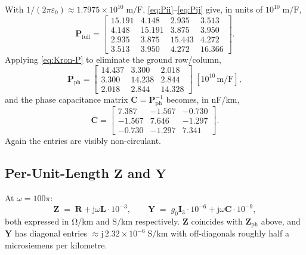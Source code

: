 \documentclass[11pt,a4paper]{article}
\newcommand{\jj}{\mathrm{j}}
\newcommand{\matZ}{\bm{Z}}
\newcommand{\matY}{\bm{Y}}
\newcommand{\matR}{\bm{R}}
\newcommand{\matL}{\bm{L}}
\newcommand{\matC}{\bm{C}}
\newcommand{\matP}{\bm{P}}
\newcommand{\matI}{\bm{I}}
\begin{document}
With \(1/(2\pi\varepsilon_{0})\approx 1.7975\times 10^{10}\;\si{\metre/\farad}\), \eqref{eq:Pii}--\eqref{eq:Pij} give, in units of
\(10^{10}\;\si{\metre/\farad}\),
\begin{equation*}
\matP_{\mathrm{full}}=
\begin{bmatrix}
15.191 & 4.148 & 2.935 & 3.513\\
4.148 & 15.191 & 3.875 & 3.950\\
2.935 & 3.875 & 15.443 & 4.272\\
3.513 & 3.950 & 4.272 & 16.366
\end{bmatrix}.
\end{equation*}
Applying \eqref{eq:Kron-P} to eliminate the ground row/column,
\begin{equation*}
\matP_{\mathrm{ph}}=
\begin{bmatrix}
14.437 & 3.300 & 2.018\\
3.300 & 14.238 & 2.844\\
2.018 & 2.844 & 14.328
\end{bmatrix}\;[10^{10}\,\si{\metre/\farad}],
\end{equation*}
and the phase capacitance matrix
\(\matC=\matP_{\mathrm{ph}}^{-1}\) becomes, in \si{\nano\farad/\kilo\metre},
\begin{equation*}
\matC=
\begin{bmatrix}
7.387 & -1.567 & -0.730\\
-1.567 & 7.646 & -1.297\\
-0.730 & -1.297 & 7.341
\end{bmatrix}.
\end{equation*}
Again the entries are visibly non-circulant.

\subsection{\texorpdfstring{Per-Unit-Length \(\matZ\) and \(\matY\)}{Per-Unit-Length Z and Y}}

At \(\omega=100\pi\):
\begin{equation*}
\matZ\;=\;\matR+\jj\omega\matL\cdot 10^{-3},\qquad
\matY\;=\;g_{0}\matI_{3}\cdot 10^{-6}+\jj\omega\matC\cdot 10^{-9},
\end{equation*}
both expressed in \(\si{\ohm/\kilo\metre}\) and \(\si{\siemens/\kilo\metre}\)
respectively. \(\matZ\) coincides with \(\matZ_{\mathrm{ph}}\) above, and
\(\matY\) has diagonal entries \(\approx\jj\,2.32\times 10^{-6}\;\si{\siemens/\kilo\metre}\) with off-diagonals roughly half a microsiemens per kilometre.
\end{document}
